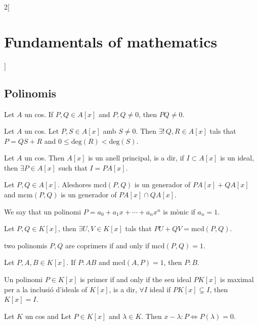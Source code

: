 \documentclass[../../../main.tex]{subfiles}
\begin{document}
\begin{multicols}{2}[\section{Fundamentals of mathematics}]
    \subsection{Polinomis}
    \begin{prop}
    Let $A$ un cos. If $P,Q\in A[x]$ and $P,Q\ne0$, then $PQ\ne 0$.
    \end{prop}
    \begin{theorem}
    Let $A$ un cos. Let $P,S\in A[x]$ amb $S\ne 0$. Then $\exists!\, Q,R\in A[x]$ tals that $P=QS+R$ and $0\leq\text{deg}(R)<\text{deg}(S)$.
    \end{theorem}
    \begin{theorem}
    Let $A$ un cos. Then $A[x]$ is un anell principal, is a dir, if $I\subset A[x]$ is un ideal, then $\exists P\in A[x]$ such that $I=PA[x]$.
    \end{theorem}
    \begin{definition}
    Let $P,Q\in A[x]$. Aleshores $\text{mcd}(P,Q)$ is un generador of $PA[x]+QA[x]$ and $\text{mcm}(P,Q)$ is un generador of $PA[x]\cap QA[x]$.
    \end{definition}
    \begin{definition}
    We say that un polinomi $P=a_0+a_1x+\cdots+a_nx^n$ is mònic if $a_n=1$.
    \end{definition}
    \begin{theorem}
    Let $P,Q\in K[x]$, then $\exists U,V\in K[x]$ tals that $PU+QV=\text{mcd}(P,Q)$.
    \end{theorem}
    \begin{definition}
    two polinomis $P,Q$ are coprimers if and only if $\text{mcd}(P,Q)=1$.
    \end{definition}
    \begin{theorem}
    Let $P,A,B\in K[x]$. If $P: AB$ and $\text{mcd}(A,P)=1$, then $P: B$.
    \end{theorem}
    \begin{definition}
    Un polinomi $P\in K[x]$ is primer if and only if the seu ideal $PK[x]$ is maximal per a la inclusió d'ideals of $K[x]$, is a dir, $\forall I$ ideal if $PK[x] \varsubsetneq I$, then $K[x]=I$.
    \end{definition}
    \begin{theorem}
    Let $K$ un cos and Let $P\in K[x]$ and $\lambda\in K$. Then $x-\lambda: P\iff P(\lambda)=0$.
    \end{theorem}
    \begin{definition}

\end{definition}
\end{multicols}
\end{document}
